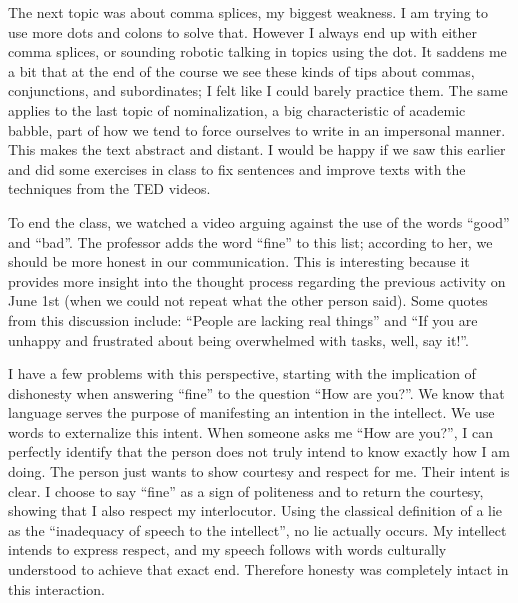 The next topic was about comma splices, my biggest weakness. I am trying to use more dots and colons to solve that. However I always end up with either comma splices, or sounding robotic talking in topics using the dot. It saddens me a bit that at the end of the course we see these kinds of tips about commas, conjunctions, and subordinates; I felt like I could barely practice them. The same applies to the last topic of nominalization, a big characteristic of academic babble, part of how we tend to force ourselves to write in an impersonal manner. This makes the text abstract and distant. I would be happy if we saw this earlier and did some exercises in class to fix sentences and improve texts with the techniques from the TED videos.

To end the class, we watched a video arguing against the use of the words ``good'' and ``bad''. The professor adds the word ``fine'' to this list; according to her, we should be more honest in our communication. This is interesting because it provides more insight into the thought process regarding the previous activity on June 1st (when we could not repeat what the other person said). Some quotes from this discussion include: ``People are lacking real things'' and ``If you are unhappy and frustrated about being overwhelmed with tasks, well, say it!''.

I have a few problems with this perspective, starting with the implication of dishonesty when answering ``fine'' to the question ``How are you?''. We know that language serves the purpose of manifesting an intention in the intellect. We use words to externalize this intent. When someone asks me ``How are you?'', I can perfectly identify that the person does not truly intend to know exactly how I am doing. The person just wants to show courtesy and respect for me. Their intent is clear. I choose to say ``fine'' as a sign of politeness and to return the courtesy, showing that I also respect my interlocutor. Using the classical definition of a lie as the ``inadequacy of speech to the intellect'', no lie actually occurs. My intellect intends to express respect, and my speech follows with words culturally understood to achieve that exact end. Therefore honesty was completely intact in this interaction. 

